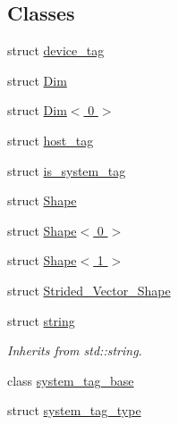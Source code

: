 \subsection*{Classes}
\begin{DoxyCompactItemize}
\item 
struct \hyperlink{structbc_1_1device__tag}{device\+\_\+tag}
\item 
struct \hyperlink{structbc_1_1Dim}{Dim}
\item 
struct \hyperlink{structbc_1_1Dim_3_010_01_4}{Dim$<$ 0 $>$}
\item 
struct \hyperlink{structbc_1_1host__tag}{host\+\_\+tag}
\item 
struct \hyperlink{structbc_1_1is__system__tag}{is\+\_\+system\+\_\+tag}
\item 
struct \hyperlink{structbc_1_1Shape}{Shape}
\item 
struct \hyperlink{structbc_1_1Shape_3_010_01_4}{Shape$<$ 0 $>$}
\item 
struct \hyperlink{structbc_1_1Shape_3_011_01_4}{Shape$<$ 1 $>$}
\item 
struct \hyperlink{structbc_1_1Strided__Vector__Shape}{Strided\+\_\+\+Vector\+\_\+\+Shape}
\item 
struct \hyperlink{structbc_1_1string}{string}
\begin{DoxyCompactList}\small\item\em Inherits from std\+::string. \end{DoxyCompactList}\item 
class \hyperlink{classbc_1_1system__tag__base}{system\+\_\+tag\+\_\+base}
\item 
struct \hyperlink{structbc_1_1system__tag__type}{system\+\_\+tag\+\_\+type}
\end{DoxyCompactItemize}

